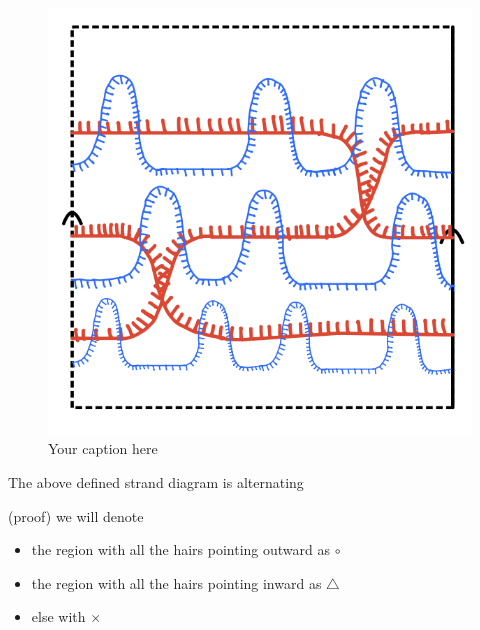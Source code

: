 \begin{figure}[H] %
    \centering
    \includegraphics[scale = 0.95]{diagrams/natural_alternating_diagrams/10.png} %
    \caption{Your caption here}
    \label{fig:your-label}
\end{figure}
\begin{theorem}
The above defined strand diagram is alternating
\end{theorem}
(proof) we will denote 
\begin{itemize}
\item the region with all the hairs pointing outward as $\circ$
\item the region with all the hairs pointing inward as $\bigtriangleup$
\item else with $\times$
\end{itemize}

